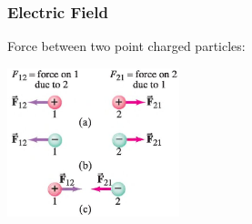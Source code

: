 \documentclass[]{beamer}
\begin{document}
\begin{frame}
\frametitle{Electric Field}

Force between two point charged particles:
\vspace{3mm}

\pause

\begin{center}
  \includegraphics[height=1.7in]{images5/1.jpg}
\end{center}


















  \end{frame}





\end{document}
